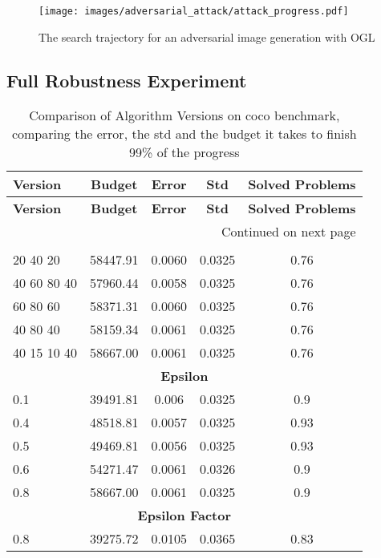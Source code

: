 \begin{figure}[ht]
\label{egl_advarserial_attack_progression}
    \centering
    \texttt{[image: images/adversarial\_attack/attack\_progress.pdf]}
    \caption{The search trajectory for an adversarial image generation with OGL}
    \label{fig:model_images}
\end{figure}


\subsection{Full Robustness Experiment}

\begin{longtable}[H]{lcccc}
\caption{Comparison of Algorithm Versions on coco benchmark, comparing the error, the std and the budget it takes to finish 99\% of the progress} \label{tab:algorithm_versions} \\
\toprule
\textbf{Version} & \textbf{Budget} & \textbf{Error} & \textbf{Std} & \textbf{Solved Problems} \\
\midrule
\endfirsthead
\toprule
\textbf{Version} & \textbf{Budget} & \textbf{Error} & \textbf{Std} & \textbf{Solved Problems} \\
\midrule
\endhead
\midrule
\multicolumn{5}{r}{{Continued on next page}} \\
\midrule
\endfoot
\bottomrule
\endlastfoot
\multicolumn{5}{c}{\textbf{networks}} \\
20 40 20 & 58447.91 & 0.0060 & 0.0325 & 0.76 \\
40 60 80 40 & 57960.44 & 0.0058 & 0.0325 & 0.76 \\
60 80 60 & 58371.31 & 0.0060 & 0.0325 & 0.76 \\
40 80 40 & 58159.34 & 0.0061 & 0.0325 & 0.76 \\
40 15 10 40 & 58667.00 & 0.0061 & 0.0325 & 0.76 \\
\midrule
\multicolumn{5}{c}{\textbf{Epsilon}} \\
0.1 & 39491.81 & 0.006 & 0.0325 & 0.9 \\
0.4 & 48518.81 & 0.0057 & 0.0325 & 0.93 \\
0.5 & 49469.81 & 0.0056 & 0.0325 & 0.93 \\
0.6 & 54271.47 & 0.0061 & 0.0326 & 0.9 \\
0.8 & 58667.00 & 0.0061 & 0.0325 & 0.9 \\
\midrule
\multicolumn{5}{c}{\textbf{Epsilon Factor}} \\
0.8 & 39275.72 & 0.0105 & 0.0365 & 0.83 \\

\end{longtable}
